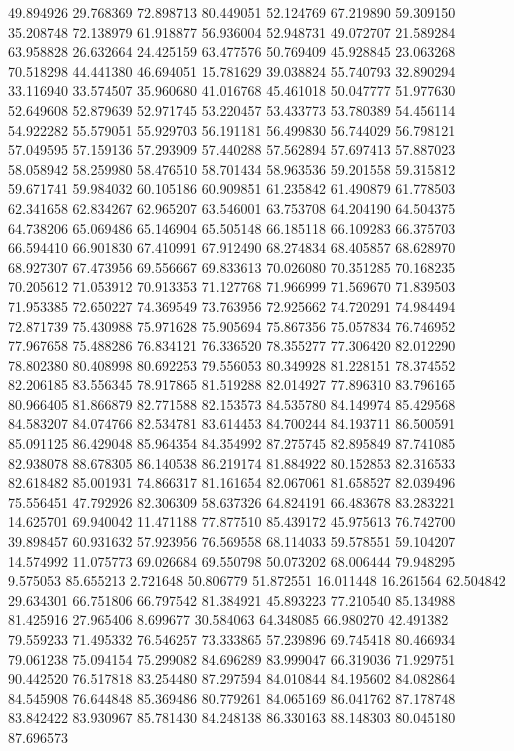 49.894926
29.768369
72.898713
80.449051
52.124769
67.219890
59.309150
35.208748
72.138979
61.918877
56.936004
52.948731
49.072707
21.589284
63.958828
26.632664
24.425159
63.477576
50.769409
45.928845
23.063268
70.518298
44.441380
46.694051
15.781629
39.038824
55.740793
32.890294
33.116940
33.574507
35.960680
41.016768
45.461018
50.047777
51.977630
52.649608
52.879639
52.971745
53.220457
53.433773
53.780389
54.456114
54.922282
55.579051
55.929703
56.191181
56.499830
56.744029
56.798121
57.049595
57.159136
57.293909
57.440288
57.562894
57.697413
57.887023
58.058942
58.259980
58.476510
58.701434
58.963536
59.201558
59.315812
59.671741
59.984032
60.105186
60.909851
61.235842
61.490879
61.778503
62.341658
62.834267
62.965207
63.546001
63.753708
64.204190
64.504375
64.738206
65.069486
65.146904
65.505148
66.185118
66.109283
66.375703
66.594410
66.901830
67.410991
67.912490
68.274834
68.405857
68.628970
68.927307
67.473956
69.556667
69.833613
70.026080
70.351285
70.168235
70.205612
71.053912
70.913353
71.127768
71.966999
71.569670
71.839503
71.953385
72.650227
74.369549
73.763956
72.925662
74.720291
74.984494
72.871739
75.430988
75.971628
75.905694
75.867356
75.057834
76.746952
77.967658
75.488286
76.834121
76.336520
78.355277
77.306420
82.012290
78.802380
80.408998
80.692253
79.556053
80.349928
81.228151
78.374552
82.206185
83.556345
78.917865
81.519288
82.014927
77.896310
83.796165
80.966405
81.866879
82.771588
82.153573
84.535780
84.149974
85.429568
84.583207
84.074766
82.534781
83.614453
84.700244
84.193711
86.500591
85.091125
86.429048
85.964354
84.354992
87.275745
82.895849
87.741085
82.938078
88.678305
86.140538
86.219174
81.884922
80.152853
82.316533
82.618482
85.001931
74.866317
81.161654
82.067061
81.658527
82.039496
75.556451
47.792926
82.306309
58.637326
64.824191
66.483678
83.283221
14.625701
69.940042
11.471188
77.877510
85.439172
45.975613
76.742700
39.898457
60.931632
57.923956
76.569558
68.114033
59.578551
59.104207
14.574992
11.075773
69.026684
69.550798
50.073202
68.006444
79.948295
9.575053
85.655213
2.721648
50.806779
51.872551
16.011448
16.261564
62.504842
29.634301
66.751806
66.797542
81.384921
45.893223
77.210540
85.134988
81.425916
27.965406
8.699677
30.584063
64.348085
66.980270
42.491382
79.559233
71.495332
76.546257
73.333865
57.239896
69.745418
80.466934
79.061238
75.094154
75.299082
84.696289
83.999047
66.319036
71.929751
90.442520
76.517818
83.254480
87.297594
84.010844
84.195602
84.082864
84.545908
76.644848
85.369486
80.779261
84.065169
86.041762
87.178748
83.842422
83.930967
85.781430
84.248138
86.330163
88.148303
80.045180
87.696573
